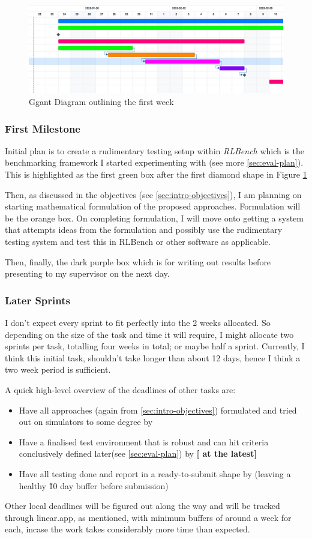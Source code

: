 \begin{figure}[h]
  \centering
  \includegraphics[width=\textwidth]{assets/initial-plan/first-week.png}
  \caption{Ggant Diagram outlining the first week}\label{fig:ggant}
\end{figure}

\subsubsection{First Milestone}
Initial plan is to create a rudimentary testing setup within \emph{RLBench} which is the benchmarking framework I started experimenting with (see more \ref{sec:eval-plan}). This is highlighted as the first green box after the first diamond shape in Figure \ref{fig:ggant}

Then, as discussed in the objectives (see \ref{sec:intro-objectives}), I am planning on starting mathematical formulation of the proposed approaches. Formulation will be the orange box. On completing formulation, I will move onto getting a system that attempts ideas from the formulation and possibly use the rudimentary testing system and test this in RLBench or other software as applicable. 

Then, finally, the dark purple box which is for writing out results before presenting to my supervisor on the next day.

\subsubsection{Later Sprints}
I don't expect every sprint to fit perfectly into the 2 weeks allocated. So depending on the size of the task and time it will require, I might allocate two sprints per task, totalling four weeks in total; or maybe half a sprint. Currently, I think this initial task, shouldn't take longer than about 12 days, hence I think a two week period is sufficient.

A quick high-level overview of the deadlines of other tasks are:
\begin{itemize}
  \item Have all approaches (again from \ref{sec:intro-objectives}) formulated and tried out on simulators to some degree by \textbf{}
  \item Have a finalised test environment that is robust and can hit criteria conclusively defined later(see \ref{sec:eval-plan}) by \textbf{ [ at the latest] }
  \item Have all testing done and report in a ready-to-submit shape by \textbf{} (leaving a healthy \~10 day buffer before submission)
\end{itemize}

Other local deadlines will be figured out along the way and will be tracked through linear.app, as mentioned, with minimum buffers of around a week for each, incase the work takes considerably more time than expected.